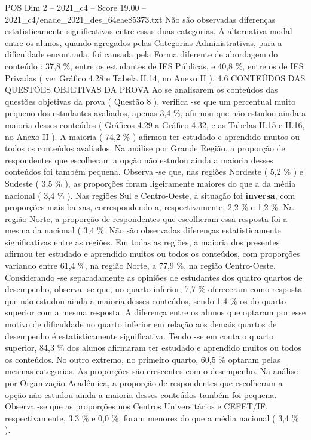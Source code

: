 \begin{textsample}{POS Dim 2 – 2021\_c4 – Score 19.00 – 2021\_c4/enade\_2021\_des\_64eae85373.txt}
Não são observadas diferenças estatisticamente significativas entre essas duas categorias.
A alternativa modal entre os alunos, quando agregados pelas Categorias Administrativas, para a dificuldade encontrada, foi causada pela Forma diferente de abordagem do conteúdo : 37,8 \%, entre os estudantes de IES Públicas, e 40,8 \%, entre os de IES Privadas ( ver Gráfico 4.28 e Tabela II.14, no Anexo II ). 4.6 CONTEÚDOS DAS QUESTÕES OBJETIVAS DA PROVA Ao se analisarem os conteúdos das questões objetivas da prova ( Questão 8 ), verifica -se que um percentual muito pequeno dos estudantes avaliados, apenas 3,4 \%, afirmou que não estudou ainda a maioria desses conteúdos ( Gráficos 4.29 a Gráfico 4.32, e as Tabelas II.15 e II.16, no Anexo II ).
A maioria ( 74,2 \% ) afirmou ter estudado e aprendido muitos ou todos os conteúdos avaliados.
Na análise por Grande Região, a proporção de respondentes que escolheram a opção não estudou ainda a maioria desses conteúdos foi também pequena.
Observa -se que, nas regiões Nordeste ( 5,2 \% ) e Sudeste ( 3,5 \% ), as proporções foram ligeiramente maiores do que a da média nacional ( 3,4 \% ).
Nas regiões Sul e Centro-Oeste, a situação foi \textbf{inversa}, com proporções mais baixas, correspondendo a, respectivamente, 2,2 \% e 1,2 \%.
Na região Norte, a proporção de respondentes que escolheram essa resposta foi a mesma da nacional ( 3,4 \%.
Não são observadas diferenças estatisticamente significativas entre as regiões.
Em todas as regiões, a maioria dos presentes afirmou ter estudado e aprendido muitos ou todos os conteúdos, com proporções variando entre 61,4 \%, na região Norte, a 77,9 \%, na região Centro-Oeste.
Considerando -se separadamente as opiniões de estudantes dos quatro quartos de desempenho, observa -se que, no quarto inferior, 7,7 \% ofereceram como resposta que não estudou ainda a maioria desses conteúdos, sendo 1,4 \% os do quarto superior com a mesma resposta.
A diferença entre os alunos que optaram por esse motivo de dificuldade no quarto inferior em relação aos demais quartos de desempenho é estatisticamente significativa.
Tendo -se em conta o quarto superior, 84,3 \% dos alunos afirmaram ter estudado e aprendido muitos ou todos os conteúdos.
No outro extremo, no primeiro quarto, 60,5 \% optaram pelas mesmas categorias.
As proporções são crescentes com o desempenho.
Na análise por Organização Acadêmica, a proporção de respondentes que escolheram a opção não estudou ainda a maioria desses conteúdos também foi pequena.
Observa -se que as proporções nos Centros Universitários e CEFET/IF, respectivamente, 3,3 \% e 0,0 \%, foram menores do que a média nacional ( 3,4 \% ).

\end{textsample}
